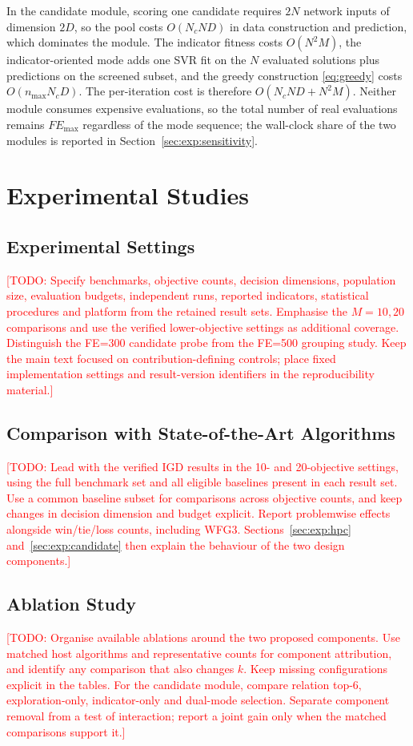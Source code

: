 \documentclass[final,5p,times,twocolumn]{elsarticle}
\newcommand{\TODO}[1]{\textcolor{red}{[TODO: #1]}}
\begin{document}
In the candidate module, scoring one candidate requires $2N$ network inputs of
dimension $2D$, so the pool costs $O(N_cND)$ in data construction and
prediction, which dominates the module. The indicator fitness costs $O(N^2M)$,
the indicator-oriented mode adds one SVR fit on the $N$ evaluated solutions plus
predictions on the screened subset, and the greedy construction \eqref{eq:greedy}
costs $O(n_{\max}N_cD)$. The per-iteration cost is therefore $O(N_cND+N^2M)$.
Neither module consumes expensive evaluations, so the total number of real
evaluations remains $FE_{\max}$ regardless of the mode sequence; the wall-clock
share of the two modules is reported in Section~\ref{sec:exp:sensitivity}.


\section{Experimental Studies}
\label{sec:exp}

\subsection{Experimental Settings}
\label{sec:exp:settings}
\TODO{Specify benchmarks, objective counts, decision dimensions, population size,
evaluation budgets, independent runs, reported indicators, statistical procedures
and platform from the retained result sets. Emphasise the $M=10,20$ comparisons
and use the verified lower-objective settings as additional coverage. Distinguish
the FE=300 candidate probe from the FE=500 grouping study. Keep the main text
focused on contribution-defining controls; place fixed implementation settings
and result-version identifiers in the reproducibility material.}

\subsection{Comparison with State-of-the-Art Algorithms}
\label{sec:exp:comparison}
\TODO{Lead with the verified IGD results in the 10- and 20-objective settings,
using the full benchmark set and all eligible baselines present in each result
set. Use a common baseline subset for comparisons across objective counts, and
keep changes in decision dimension and budget explicit. Report problemwise
effects alongside win/tie/loss counts, including WFG3. Sections~\ref{sec:exp:hpc}
and~\ref{sec:exp:candidate} then explain the behaviour of the two design components.}

\subsection{Ablation Study}
\label{sec:exp:ablation}
\TODO{Organise available ablations around the two proposed components. Use
matched host algorithms and representative counts for component attribution,
and identify any comparison that also changes $k$. Keep missing configurations
explicit in the tables. For the candidate module, compare relation top-$6$,
exploration-only, indicator-only and dual-mode selection. Separate component
removal from a test of interaction; report a joint gain only when the matched
comparisons support it.}
\end{document}
